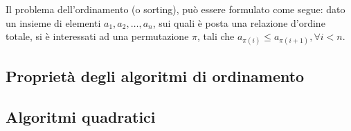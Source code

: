 \documentclass{subfiles}
\begin{document}
Il problema dell'ordinamento (o sorting), può essere formulato come segue: dato un insieme di elementi \(a_{1}, a_{2}, \ldots, a_{n}\), sui quali è posta una relazione d'ordine totale,
si è interessati ad una permutazione \(\pi\), tali che \(a_{\pi(i)} \le a_{\pi(i + 1)}, \forall i < n\).

\subsection{Proprietà degli algoritmi di ordinamento}


\subsection{Algoritmi quadratici}

\end{document}
